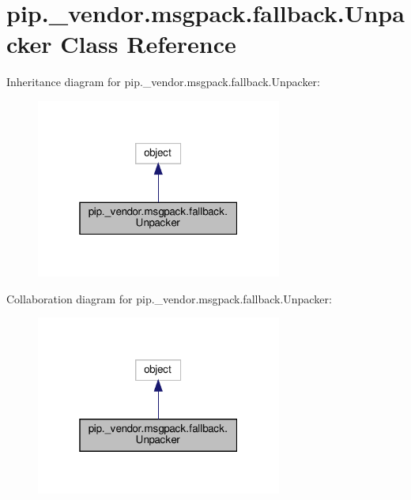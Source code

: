 \hypertarget{classpip_1_1__vendor_1_1msgpack_1_1fallback_1_1Unpacker}{}\section{pip.\+\_\+vendor.\+msgpack.\+fallback.\+Unpacker Class Reference}
\label{classpip_1_1__vendor_1_1msgpack_1_1fallback_1_1Unpacker}


Inheritance diagram for pip.\+\_\+vendor.\+msgpack.\+fallback.\+Unpacker\+:
\nopagebreak
\begin{figure}[H]
\begin{center}
\leavevmode
\includegraphics[width=229pt]{classpip_1_1__vendor_1_1msgpack_1_1fallback_1_1Unpacker__inherit__graph}
\end{center}
\end{figure}


Collaboration diagram for pip.\+\_\+vendor.\+msgpack.\+fallback.\+Unpacker\+:
\nopagebreak
\begin{figure}[H]
\begin{center}
\leavevmode
\includegraphics[width=229pt]{classpip_1_1__vendor_1_1msgpack_1_1fallback_1_1Unpacker__coll__graph}
\end{center}
\end{figure}
